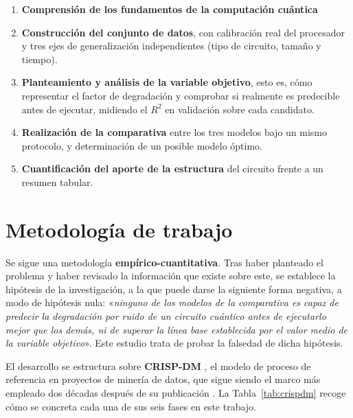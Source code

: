 \begin{enumerate}
    \item \textbf{Comprensión de los fundamentos de la computación cuántica}
    \item \textbf{Construcción del conjunto de datos}, con calibración real del procesador y
          tres ejes de generalización independientes (tipo de circuito, tamaño y tiempo).
    \item \textbf{Planteamiento y análisis de la variable objetivo}, esto es, cómo representar el factor de degradación y comprobar si realmente es predecible antes de ejecutar, midiendo el $R^2$ en validación sobre cada candidato.
    \item \textbf{Realización de la comparativa} entre los tres modelos bajo un mismo protocolo, y determinación de un posible modelo óptimo.
    \item \textbf{Cuantificación del aporte de la estructura} del circuito frente a un resumen tabular.
\end{enumerate}


\section{Metodología de trabajo}
\label{sec:metodologia}

Se sigue una metodología \textbf{empírico-cuantitativa}. Tras haber planteado el problema y haber revisado la información que existe sobre este, se establece la hipótesis de la investigación, a la que puede darse la siguiente forma negativa, a modo de
hipótesis nula: «\textit{ninguno de los modelos de la comparativa es capaz de predecir la
degradación por ruido de un circuito cuántico antes de ejecutarlo mejor que los demás, ni de
superar la línea base establecida por el valor medio de la variable objetivo}». Este estudio
trata de probar la falsedad de dicha hipótesis.


El desarrollo se estructura sobre \textbf{CRISP-DM} \cite{wirth2000crispdm}, el modelo de
proceso de referencia en proyectos de minería de datos, que sigue siendo el marco más
empleado dos décadas después de su publicación \cite{schroer2021crispdm}. La
Tabla~\ref{tab:crispdm} recoge cómo se concreta cada una de sus seis fases en este trabajo.


